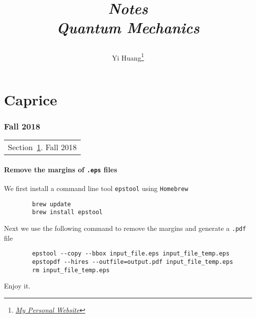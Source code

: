 \documentclass[10pt]{article}
\title{\begin{center}{\Huge \textit{Notes}}\\{{\itshape Quantum Mechanics}}\end{center}}
\author{Yi Huang\footnote{\href{https://yiihuang.com/}{\textit{My Personal Website}}}}
\affiliation{
University of Minnesota
}
\begin{document}
	\maketitle
	\flushbottom
	\newpage
	\pagestyle{fancynotes}
	\part{Caprice}
	\section{Fall 2018}\label{sec:fall2018}
	\begin{margintable}\vspace{.8in}\footnotesize
		\begin{tabularx}{\marginparwidth}{|X}
		Section~\ref{sec:fall2018}. Fall 2018\\
		\end{tabularx}
	\end{margintable}

	\subsection{Remove the margins of \texttt{.eps} files}

	We first install a command line tool \texttt{epstool} using \texttt{Homebrew}
	\begin{verbatim}
		brew update
		brew install epstool
	\end{verbatim}
	Next we use the following command to remove the margins and generate a \texttt{.pdf} file
	\begin{verbatim}
		epstool --copy --bbox input_file.eps input_file_temp.eps
		epstopdf --hires --outfile=output.pdf input_file_temp.eps
		rm input_file_temp.eps
	\end{verbatim}
	Enjoy it.
\end{document}
